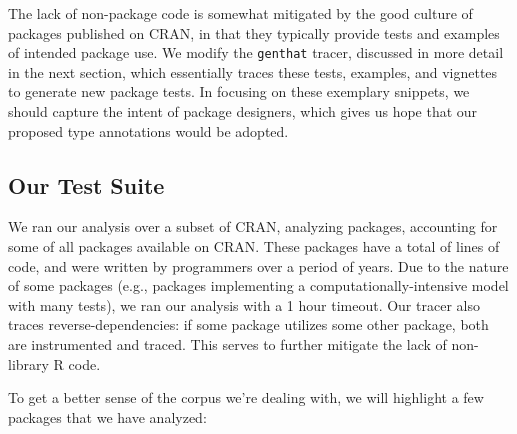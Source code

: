 \documentclass[acmsmall,10pt,review,anonymous]{acmart}\settopmatter{printfolios=true,printccs=false,printacmref=false}
\begin{document}
The lack of non-package code is somewhat mitigated by the good culture of packages published on CRAN, in that they typically provide tests and examples of intended package use.
We modify the {\tt genthat} tracer, discussed in more detail in the next section, which essentially traces these tests, examples, and vignettes to generate new package tests.
In focusing on these exemplary snippets, we should capture the intent of package designers, which gives us hope that our proposed type annotations would be adopted.

%
%
%
%
\subsection{Our Test Suite}

We ran our analysis over a subset of CRAN, analyzing \PACKAGES packages, accounting for some \PERCENTCRAN of all packages available on CRAN.
These packages have a total of \RLOC lines of code, and were written by \PROGRAMMERS programmers over a period of \YEARS years.
  Due to the nature of some packages (e.g., packages implementing a computationally-intensive model with many tests), we ran our analysis with a 1 hour timeout.
Our tracer also traces reverse-dependencies: if some package utilizes some other package, both are instrumented and traced.
This serves to further mitigate the lack of non-library R code.

To get a better sense of the corpus we're dealing with, we will highlight a few packages that we have analyzed:
\end{document}
